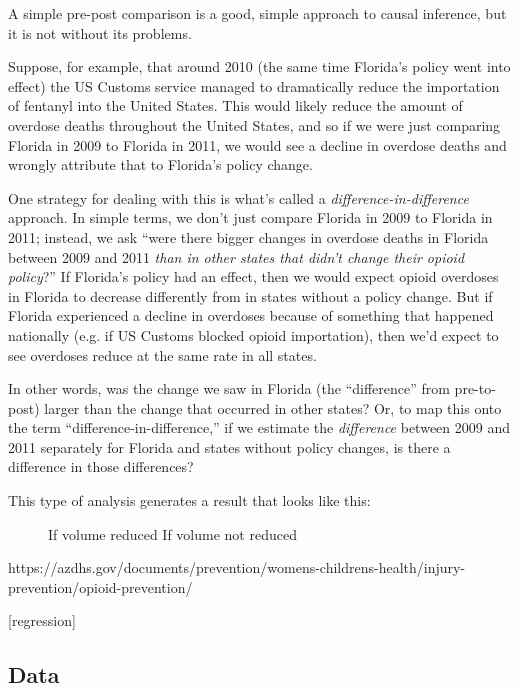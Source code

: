 \documentclass[12pt]{article}
\begin{document}
A simple pre-post comparison is a good, simple approach to causal inference, but it is not without its problems.

Suppose, for example, that around 2010 (the same time Florida's policy went into effect) the US Customs service managed to dramatically reduce the importation of fentanyl into the United States. This would likely reduce the amount of overdose deaths throughout the United States, and so if we were just comparing Florida in 2009 to Florida in 2011, we would see a decline in overdose deaths and wrongly attribute that to Florida's policy change.

One strategy for dealing with this is what's called a \emph{difference-in-difference} approach. In simple terms, we don't just compare Florida in 2009 to Florida in 2011; instead, we ask ``were there bigger changes in overdose deaths in Florida between 2009 and 2011 \emph{than in other states that didn't change their opioid policy}?'' If Florida's policy had an effect, then we would expect opioid overdoses in Florida to decrease differently from in states without a policy change. But if Florida experienced a decline in overdoses because of something that happened nationally (e.g. if US Customs blocked opioid importation), then we'd expect to see overdoses reduce at the same rate in all states.

In other words, was the change we saw in Florida (the ``difference'' from pre-to-post) larger than the change that occurred in other states? Or, to map this onto the term ``difference-in-difference,'' if we estimate the \emph{difference} between 2009 and 2011 separately for Florida and states without policy changes, is there a difference in those differences?

This type of analysis generates a result that looks like this:

\begin{figure}
  \centering
  \caption{}\label{}
  If volume reduced  \hspace{1cm} If volume not reduced
\end{figure}

https://azdhs.gov/documents/prevention/womens-childrens-health/injury-prevention/opioid-prevention/

[regression]

\subsection*{Data}
\end{document}
